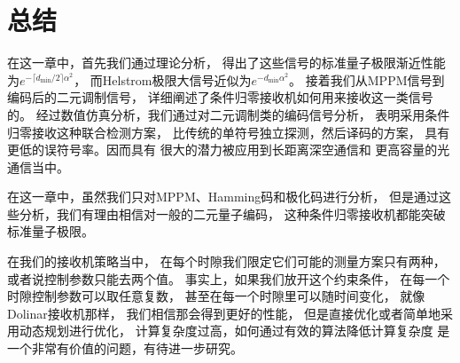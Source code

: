 \section{总结}

在这一章中，首先我们通过理论分析，
得出了这些信号的标准量子极限渐近性能为$e^{-\lceil d_{\min}/2\rceil \alpha^2}$，
而Helstrom极限大信号近似为$e^{-d_{\min} \alpha^2}$。
接着我们从MPPM信号到编码后的二元调制信号，
详细阐述了条件归零接收机如何用来接收这一类信号的。
经过数值仿真分析，我们通过对二元调制类的编码信号分析，
表明采用条件归零接收这种联合检测方案，
比传统的单符号独立探测，然后译码的方案，
具有更低的误符号率。因而具有
很大的潜力被应用到长距离深空通信和
更高容量的光通信当中。

在这一章中，虽然我们只对MPPM、Hamming码和极化码进行分析，
但是通过这些分析，我们有理由相信对一般的二元量子编码，
这种条件归零接收机都能突破标准量子极限。

在我们的接收机策略当中，
在每个时隙我们限定它们可能的测量方案只有两种，
或者说控制参数只能去两个值。
事实上，如果我们放开这个约束条件，
在每一个时隙控制参数可以取任意复数，
甚至在每一个时隙里可以随时间变化，
就像Dolinar接收机那样，
我们相信那会得到更好的性能，
但是直接优化或者简单地采用动态规划进行优化，
计算复杂度过高，如何通过有效的算法降低计算复杂度
是一个非常有价值的问题，有待进一步研究。

